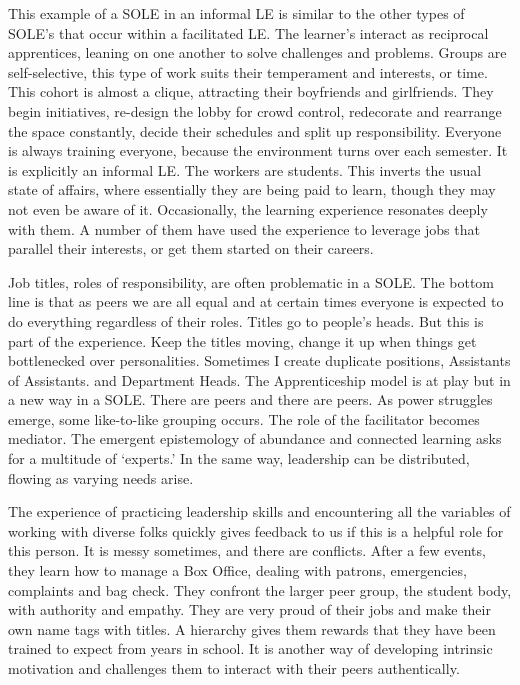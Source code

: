 This example of a SOLE in an informal LE is similar to the other types
of SOLE's that occur within a facilitated LE. The learner's interact as
reciprocal apprentices, leaning on one another to solve challenges and
problems. Groups are self-selective, this type of work suits their
temperament and interests, or time. This cohort is almost a clique,
attracting their boyfriends and girlfriends. They begin initiatives,
re-design the lobby for crowd control, redecorate and rearrange the
space constantly, decide their schedules and split up responsibility.
Everyone is always training everyone, because the environment turns over
each semester. It is explicitly an informal LE. The workers are
students. This inverts the usual state of affairs, where essentially
they are being paid to learn, though they may not even be aware of it.
Occasionally, the learning experience resonates deeply with them. A
number of them have used the experience to leverage jobs that parallel
their interests, or get them started on their careers.

Job titles, roles of responsibility, are often problematic in a SOLE.
The bottom line is that as peers we are all equal and at certain times
everyone is expected to do everything regardless of their roles. Titles
go to people's heads. But this is part of the experience. Keep the
titles moving, change it up when things get bottlenecked over
personalities. Sometimes I create duplicate positions, Assistants of
Assistants. and Department Heads. The Apprenticeship model is at play
but in a new way in a SOLE. There are peers and there are peers. As
power struggles emerge, some like-to-like grouping occurs. The role of
the facilitator becomes mediator. The emergent epistemology of abundance
and connected learning asks for a multitude of `experts.' In the same
way, leadership can be distributed, flowing as varying needs arise.

The experience of practicing leadership skills and encountering all the
variables of working with diverse folks quickly gives feedback to us if
this is a helpful role for this person. It is messy sometimes, and there
are conflicts. After a few events, they learn how to manage a Box
Office, dealing with patrons, emergencies, complaints and bag check.
They confront the larger peer group, the student body, with authority
and empathy. They are very proud of their jobs and make their own name
tags with titles. A hierarchy gives them rewards that they have been
trained to expect from years in school. It is another way of developing
intrinsic motivation and challenges them to interact with their peers
authentically.

